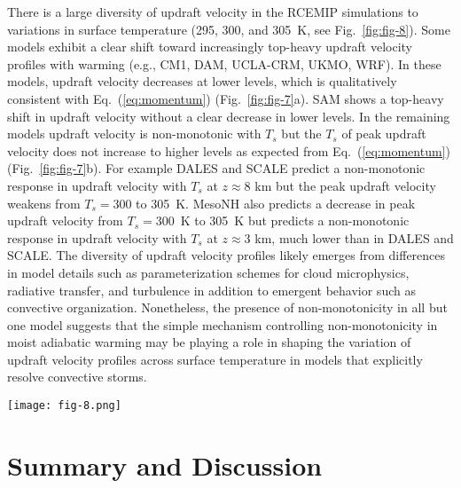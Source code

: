 \documentclass[]{ametsocV6.1}
\begin{document}
There is a large diversity of updraft velocity in the RCEMIP simulations to variations in surface temperature (295, 300, and 305~K, see Fig.~\ref{fig:fig-8}). Some models exhibit a clear shift toward increasingly top-heavy updraft velocity profiles with warming (e.g., CM1, DAM, UCLA-CRM, UKMO, WRF). In these models, updraft velocity decreases at lower levels, which is qualitatively consistent with Eq.~(\ref{eq:momentum}) (Fig.~\ref{fig:fig-7}a). SAM shows a top-heavy shift in updraft velocity without a clear decrease in lower levels. In the remaining models updraft velocity is non-monotonic with $T_s$ but the $T_s$ of peak updraft velocity does not increase to higher levels as expected from Eq.~(\ref{eq:momentum}) (Fig.~\ref{fig:fig-7}b). For example DALES and SCALE predict a non-monotonic response in updraft velocity with $T_s$ at $z\approx8$ km but the peak updraft velocity weakens from $T_s=300$ to 305~K. MesoNH also predicts a decrease in peak updraft velocity from $T_s=300$~K to 305~K but predicts a non-monotonic response in updraft velocity with $T_s$ at $z\approx3$ km, much lower than in DALES and SCALE. The diversity of updraft velocity profiles likely emerges from differences in model details such as parameterization schemes for cloud microphysics, radiative transfer, and turbulence in addition to emergent behavior such as convective organization. Nonetheless, the presence of non-monotonicity in all but one model suggests that the simple mechanism controlling non-monotonicity in moist adiabatic warming may be playing a role in shaping the variation of updraft velocity profiles across surface temperature in models that explicitly resolve convective storms.

\begin{figure*}[htbp]
 \centering
 \texttt{[image: fig-8.png]}\\
 \caption{Updraft velocity from 9 cloud-resolving models (CM1, DALES, DAM, MesoNH, SAM-CRM, SCALE, UCLA-CRM, UKMO-CASIM, and WRF) that participated in RCEMIP \citep{wing2018}. The simulations are on a 100~km $\times$ 100~km periodic domain for uniform sea surface temperatures set to 295 (blue), 300 (black), and 305~K (red). Updraft velocity at each level is the mean of vertical velocities $w$ that exceed the 99.9th percentile ($w_{>99.9}$, defined separately for each model).}\label{fig:fig-8}
\end{figure*}

\section{Summary and Discussion}
\end{document}
